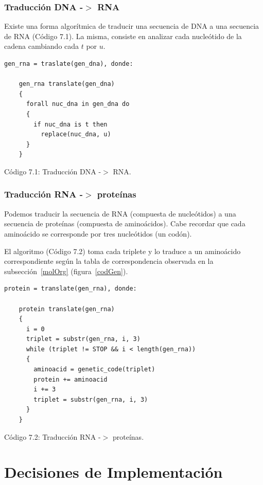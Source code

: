\subsubsection{Traducción DNA -$>$ RNA}
\par Existe una forma algorítmica de traducir una secuencia de DNA a una secuencia de RNA (Código 7.1). La misma, consiste en analizar cada nucleótido de la cadena cambiando cada $t$ por $u$.

	\begin{lstlisting}[basicstyle=\tt, frame=trBL, tabsize=4,fontadjust=true]
	gen_rna = traslate(gen_dna), donde: 
		
	gen_rna translate(gen_dna) 
	{
	  forall nuc_dna in gen_dna do 
	  {
	    if nuc_dna is t then 
          replace(nuc_dna, u)
	  }
	}	
	\end{lstlisting}
	\hspace*{3.5cm}\caption{Código 7.1: Traducción DNA -$>$ RNA.}

\subsubsection{Traducción RNA -$>$ proteínas}
\par Podemos traducir la secuencia de RNA (compuesta de nucleótidos) a una secuencia de proteínas (compuesta de aminoácidos). Cabe recordar que cada aminoácido se corresponde por tres nucleótidos (un codón).
\par El algoritmo (Código 7.2) toma cada triplete y lo traduce a un aminoácido correspondiente según la tabla de correspondencia observada en la subsección~\ref{molOrg} (figura~\ref{codGen}).
	
\begin{minipage}{\linewidth}
	\begin{lstlisting}[basicstyle=\tt, frame=trBL, tabsize=4,fontadjust=true]
	protein = translate(gen_rna), donde:
		
	protein translate(gen_rna)
	{
	  i = 0
	  triplet = substr(gen_rna, i, 3)
	  while (triplet != STOP && i < length(gen_rna))
	  {
		aminoacid = genetic_code(triplet)			
		protein += aminoacid
		i += 3						    
	    triplet = substr(gen_rna, i, 3)
	  }
	}
	\end{lstlisting}
\end{minipage}
\hspace*{3.5cm}\caption{Código 7.2: Traducción RNA -$>$ proteínas.}

\section{Decisiones de Implementación}
